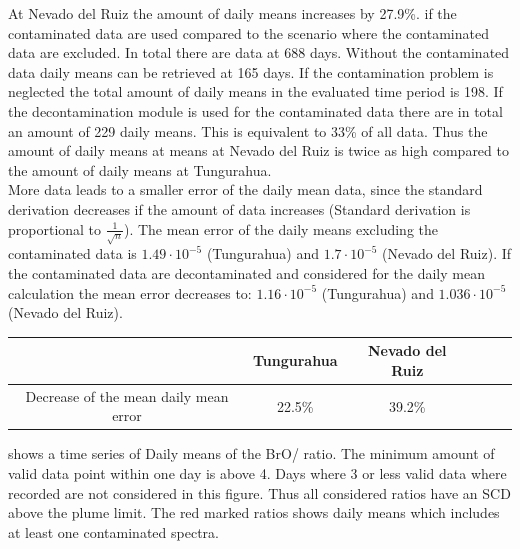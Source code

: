 \documentclass  [
  paper    = a4,
  BCOR     = 10mm,
  twoside,
  fontsize = 12pt,
  fleqn,
  toc      = bibnumbered,
  toc      = listofnumbered,
  numbers  = noendperiod,
  headings = normal,
  listof   = leveldown,
  version  = 3.03
]                                       {scrreprt}
\begin{document}
	At Nevado del Ruiz the amount of daily means increases by 27.9\%. if the contaminated data are used compared to the scenario where the contaminated data are excluded.
	In total there are data at 688 days. Without the contaminated data daily means can be retrieved at 165 days.
	If the contamination problem is neglected the total amount of daily means in the evaluated time period is 198. If the decontamination module is used for the contaminated data there are in total an amount of 229 daily means. This is  equivalent to 33\% of all data. Thus the amount of daily means at means at Nevado del Ruiz is twice as high compared to the amount of daily means at Tungurahua.\\
	More data leads to a smaller error of the daily mean data, since the standard derivation decreases if the amount of data increases (Standard derivation is proportional to $\frac{1}{\sqrt{n}}$). The mean error of the daily means excluding the contaminated data is $1.49\cdot 10^{-5}$ (Tungurahua) and $1.7\cdot 10^{-5}$ (Nevado del Ruiz). If the contaminated data are decontaminated and considered for the daily mean calculation the mean error decreases to: $1.16\cdot 10^{-5}$ (Tungurahua) and $1.036\cdot 10^{-5}$ (Nevado del Ruiz).
	\begin{table}
		\centering
		\begin{tabular}{ccc p{4cm}p{4cm}p{4cm}}
		&Tungurahua&Nevado del Ruiz\\
		\toprule
		Decrease of the mean daily mean error&22.5\%&39.2\%\\
		\bottomrule			
	\end{tabular}
	\end{table}		
	 shows a time series of Daily means of the BrO/ ratio. The minimum amount of valid data point within one day is above 4. Days where 3 or less valid data where recorded are not considered in this figure.  Thus all considered ratios have an  SCD above the plume limit. The red marked ratios shows daily means which includes at least one contaminated spectra.
%
%
\FloatBarrier
\end{document}
